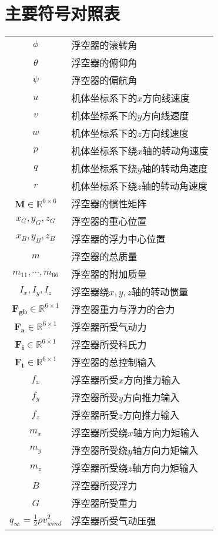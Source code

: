 \chapter{主要符号对照表}
\label{chap:symb}

\begin{longtable}{cl}
$\phi$ & 浮空器的滚转角 \\
$\theta$ & 浮空器的俯仰角 \\
$\psi$ & 浮空器的偏航角 \\
$u$ & 机体坐标系下的$x$方向线速度 \\
$v$ & 机体坐标系下的$y$方向线速度 \\
$w$ & 机体坐标系下的$z$方向线速度 \\
$p$ & 机体坐标系下绕$x$轴的转动角速度 \\
$q$ & 机体坐标系下绕$y$轴的转动角速度 \\
$r$ & 机体坐标系下绕$z$轴的转动角速度 \\
$\mathbf{M}\in\mathbb{R}^{6\times6}$ & 浮空器的惯性矩阵\\ 
$x_G,y_G,z_G$ & 浮空器的重心位置 \\
$x_B,y_B,z_B$ & 浮空器的浮力中心位置 \\
$m$ & 浮空器的总质量 \\
$m_{11},\cdots,m_{66}$ & 浮空器的附加质量 \\
$I_x,I_y,I_z$ & 浮空器绕$x,y,z$轴的转动惯量 \\
$\mathbf{F_{gb}}\in\mathbb{R}^{6\times1}$ & 浮空器重力与浮力的合力 \\
$\mathbf{F_a}\in\mathbb{R}^{6\times1}$ & 浮空器所受气动力 \\
$\mathbf{F_i}\in\mathbb{R}^{6\times1}$ & 浮空器所受科氏力 \\
$\mathbf{F_t}\in\mathbb{R}^{6\times1}$ & 浮空器的总控制输入 \\
$f_x$ & 浮空器所受$x$方向推力输入 \\
$f_y$ & 浮空器所受$y$方向推力输入 \\
$f_z$ & 浮空器所受$z$方向推力输入 \\
$m_x$ & 浮空器所受绕$x$轴方向力矩输入 \\
$m_y$ & 浮空器所受绕$y$轴方向力矩输入 \\
$m_z$ & 浮空器所受绕$z$轴方向力矩输入 \\
$B$ & 浮空器所受浮力 \\
$G$ & 浮空器所受重力 \\
$q_{\infty}=\frac{1}{2}\rho v_{wind}^2$ & 浮空器所受气动压强 \\

\end{longtable}
